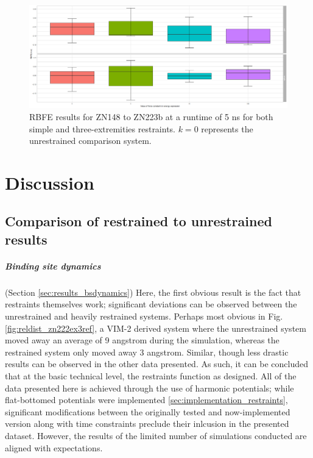 \documentclass[oneside]{scrreprt}
\begin{document}
\begin{figure}[h]
    \centering
    \includegraphics[width=1\textwidth]{plots/boxplot_rbfe_zn222_5ns.png}
    \caption[RBFE results for ZN148 to ZN223b]{RBFE results for ZN148 to ZN223b at a runtime of 5 ns for both simple and three-extremities restraints. $k=0$ represents the unrestrained comparison system.}
    
\end{figure}
\newpage

\chapter{Discussion}

\section{Comparison of restrained to unrestrained results}
\paragraph{Binding site dynamics} (Section \ref{sec:results_bsdynamics}) Here, the first obvious result is the fact that restraints themselves work; significant deviations can be observed between the unrestrained and heavily restrained systems. Perhaps most obvious in Fig. \ref{fig:reldist_zn222ex3ref}, a VIM-2 derived system where the unrestrained system moved away an average of 9 angstrom during the simulation, whereas the restrained system only moved away 3 angstrom. Similar, though less drastic results can be observed in the other data presented. As such, it can be concluded that at the basic technical level, the restraints function as designed. All of the data presented here is achieved through the use of harmonic potentials; while flat-bottomed potentials were implemented \ref{sec:implementation_restraints}, significant modifications between the originally tested and now-implemented version along with time constraints preclude their inlcusion in the presented dataset. However, the results of the limited number of simulations conducted are aligned with expectations.
\end{document}
